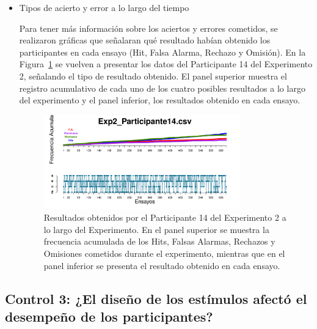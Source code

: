 \begin{itemize}


	\item Tipos de acierto y error a lo largo del tiempo

Para tener más información sobre los aciertos y errores cometidos, se realizaron gráficas que señalaran qué resultado habían obtenido los participantes en cada ensayo (Hit, Falsa Alarma, Rechazo y Omisión). En la Figura~\ref{fig:Outcome_E2_P14} se vuelven a presentar los datos del Participante 14 del Experimento 2, señalando el tipo de resultado obtenido. El panel superior muestra el registro acumulativo de cada uno de los cuatro posibles resultados a lo largo del experimento y el panel inferior, los resultados obtenido en cada ensayo.\\ 

\begin{figure}[th]
\centering
\includegraphics[width=0.80\textwidth]{Figures/Outcome_Exp2_P14}
\caption[Explorando datos individuales (ejemplo): Tipos de acierto y error obtenidos en cada ensayo]{Resultados obtenidos por el Participante 14 del Experimento 2 a lo largo del Experimento. En el panel superior se muestra la frecuencia acumulada de los Hits, Falsas Alarmas, Rechazos y Omisiones cometidos durante el experimento, mientras que en el panel inferior se presenta el resultado obtenido en cada ensayo.}
\label{fig:Outcome_E2_P14}
\end{figure}


\end{itemize}










\subsection{Control 3: ¿El diseño de los estímulos afectó el desempeño de los participantes?}

